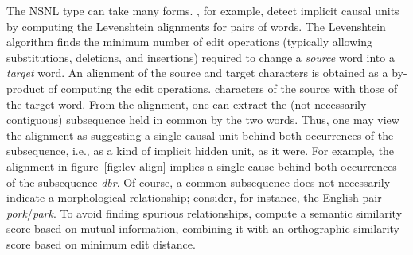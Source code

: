 {%

The NSNL type can take many forms. 
\cite{baroni-et-al:2002}, for example, detect implicit causal units by computing 
the Levenshtein alignments for pairs of words. 
The Levenshtein algorithm finds the minimum number of edit operations 
(typically allowing substitutions, deletions, and insertions) required to change 
a \textit{source} word into a \textit{target} word.
An alignment of the source and target characters is obtained as a by-product 
of computing the edit operations. 
characters of the source with those of the target word. 
From the alignment, one can extract the (not necessarily contiguous) 
subsequence held in common by the two words.
Thus, one may view the alignment as suggesting a single causal unit behind 
both occurrences of the subsequence, i.e., as a kind of implicit hidden unit, 
as it were.
For example, the alignment in figure~\ref{fig:lev-align} implies a single cause 
behind both occurrences of the subsequence \textit{dbr}.
Of course, a common subsequence does not necessarily indicate a 
morphological relationship; 
consider, for instance, the English pair \textit{pork}/\textit{park}. 
To avoid finding spurious relationships, 
\cite{baroni-et-al:2002} compute a semantic similarity score based on 
mutual information, 
combining it with an orthographic similarity score based on minimum 
edit distance.

}

